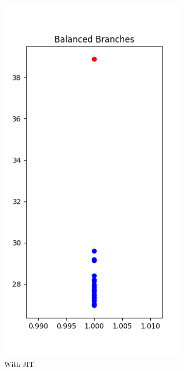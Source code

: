 \begin{figure}
\centering
\begin{subfigure}{.5\textwidth}
  \centering
  \includegraphics[width=.7\linewidth]{figures/branches0.png}
  \caption{With JIT}
  \label{fig:sub1}
\end{subfigure}%
\begin{subfigure}{.5\textwidth}
  \centering

\end{subfigure}
\end{figure}
